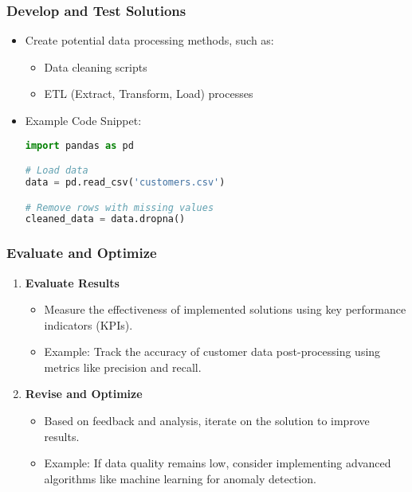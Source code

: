 \documentclass[aspectratio=169]{beamer}
\begin{document}
\begin{frame}[fragile]
    \frametitle{Develop and Test Solutions}
    \begin{itemize}
        \item Create potential data processing methods, such as:
            \begin{itemize}
                \item Data cleaning scripts
                \item ETL (Extract, Transform, Load) processes
            \end{itemize}
        \item Example Code Snippet:
        \begin{lstlisting}[language=Python]
import pandas as pd

# Load data
data = pd.read_csv('customers.csv')

# Remove rows with missing values
cleaned_data = data.dropna()
        \end{lstlisting}
    \end{itemize}
\end{frame}

\begin{frame}
    \frametitle{Evaluate and Optimize}
    \begin{enumerate}
        \item \textbf{Evaluate Results}
            \begin{itemize}
                \item Measure the effectiveness of implemented solutions using key performance indicators (KPIs).
                \item Example: Track the accuracy of customer data post-processing using metrics like precision and recall.
            \end{itemize}

        \item \textbf{Revise and Optimize}
            \begin{itemize}
                \item Based on feedback and analysis, iterate on the solution to improve results.
                \item Example: If data quality remains low, consider implementing advanced algorithms like machine learning for anomaly detection.
            \end{itemize}
    \end{enumerate}
\end{frame}
\end{document}
